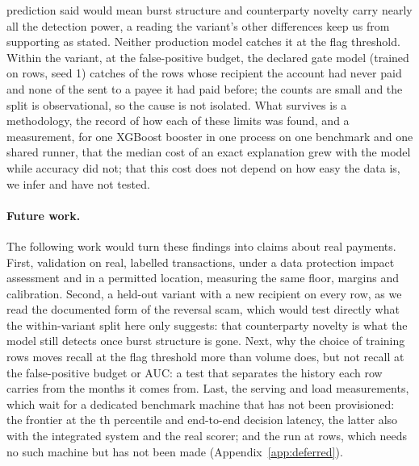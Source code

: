 prediction said would mean burst structure and
counterparty novelty carry nearly all the detection power, a reading the variant's other differences
keep us from supporting as stated. Neither production model catches it at the flag
threshold. Within the variant, at the false-positive budget, the declared gate model (trained on \nTrainUsed{} rows, seed 1) catches \nGateRevNewBudgetCaught{} of the
\nGateRevNewBudgetRows{} rows whose recipient the account had never paid and none of the
\nGateRevKnownBudgetRows{} sent to a payee it had paid before; the counts are small and
the split is observational, so the cause is not isolated. What survives is a methodology, the record of how each of these limits
was found, and a measurement, for one XGBoost booster in one process on one benchmark and one shared runner,
that the median cost of an exact explanation grew with the model while accuracy did not; that this cost does not depend on how easy the data is, we infer and
have not tested.

\paragraph{Future work.} The following work would turn these findings into claims about real payments.
First, validation on real, labelled transactions, under a data protection impact assessment and in a
permitted location, measuring the same floor, margins and calibration. Second, a held-out variant with
a new recipient on every row, as we read the documented form of the reversal scam, which would test
directly what the within-variant split here only suggests: that counterparty novelty is what the model
still detects once burst structure is gone. Next, why the choice of training rows moves recall at the flag threshold more than
volume does, but not recall at the false-positive budget or AUC: a test that separates the history each row carries from the months it comes from. Last,
the serving and load measurements, which wait for a dedicated benchmark machine that has not been
provisioned: the frontier at the \nPctlTail{}th percentile and end-to-end decision latency, the
latter also with the integrated system and the real scorer; and the run at \nSpecRows{} rows, which
needs no such machine but has not been made (Appendix~\ref{app:deferred}).
